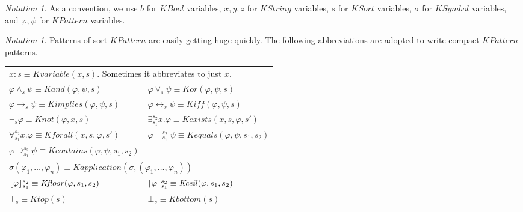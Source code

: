 \documentclass[UTF8]{article}
\newcounter{thmcounter}
\theoremstyle{plain}
\theoremstyle{definition}
\theoremstyle{remark}
\newtheorem{notation}[thmcounter]{Notation}
\newcommand{\cln}{{:}}
\DeclarePairedDelimiter{\ceil}{\lceil}{\rceil}
\DeclarePairedDelimiter{\floor}{\lfloor}{\rfloor}
\newcommand{\KBool}{\mathit{KBool}}
\newcommand{\KString}{\mathit{KString}}
\newcommand{\KSort}{\mathit{KSort}}
\newcommand{\KSymbol}{\mathit{KSymbol}}
\newcommand{\KPattern}{\mathit{KPattern}}
\newcommand{\Kvariable}{\mathit{Kvariable}}
\newcommand{\Kand}{\mathit{Kand}}
\newcommand{\Kor}{\mathit{Kor}}
\newcommand{\Kimplies}{\mathit{Kimplies}}
\newcommand{\Kiff}{\mathit{Kiff}}
\newcommand{\Knot}{\mathit{Knot}}
\newcommand{\Kapplication}{\mathit{Kapplication}}
\newcommand{\Kexists}{\mathit{Kexists}}
\newcommand{\Kforall}{\mathit{Kforall}}
\newcommand{\Kequals}{\mathit{Kequals}}
\newcommand{\Kcontains}{\mathit{Kcontains}}
\newcommand{\Ktop}{\mathit{Ktop}}
\newcommand{\Kbottom}{\mathit{Kbottom}}
\newcommand{\Kfloor}{\mathit{Kfloor}}
\newcommand{\Kceil}{\mathit{Kceil}}
\newcommand{\kand}{\wedge}
\newcommand{\kor}{\vee}
\newcommand{\kimplies}{\to}
\newcommand{\kiff}{\leftrightarrow}
\newcommand{\knot}{\neg}
\newcommand{\kexists}{\exists}
\newcommand{\kforall}{\forall}
\newcommand{\kequals}{=}
\newcommand{\kcontains}{\supseteq}
\newcommand{\kfloor}{\floor}
\newcommand{\kceil}{\ceil}
\newcommand{\ktop}{\top}
\newcommand{\kbottom}{\bot}
\begin{document}
\begin{notation}
	As a convention, we use $b$ for $\KBool$ variables, $x, y, z$ for 
	$\KString$ variables, $s$ for $\KSort$ variables, $\sigma$ for 
	$\KSymbol$ variables, and $\varphi, \psi$ for $\KPattern$ variables. 
\end{notation}

\begin{notation}
	Patterns of sort $\KPattern$ are easily getting huge quickly.
	The following abbreviations are adopted to write compact $\KPattern$ patterns.
	\begin{center}
	\begin{tabular}{ll}
    \multicolumn{2}{l}{$x \cln s \equiv \Kvariable(x, s)$. Sometimes it 
    abbreviates to just $x$.}
  \\
	$\varphi \kand_s \psi \equiv \Kand(\varphi, \psi, s)$
  & $\varphi \kor_s \psi \equiv \Kor(\varphi, \psi, s)$
  \\
    $\varphi \kimplies_s \psi \equiv \Kimplies(\varphi, \psi, s)$
  &	$\varphi \kiff_s \psi \equiv \Kiff(\varphi, \psi, s)$
  \\
    $\knot_s \varphi \equiv \Knot(\varphi, x, s)$
  & $\kexists_{s_1}^{s_2} x . \varphi \equiv \Kexists(x,s,\varphi,s')$
  \\
    $\kforall_{s_1}^{s_2} x . \varphi \equiv \Kforall(x,s,\varphi,s')$
  & $\varphi \kequals_{s_1}^{s_2} \psi \equiv \Kequals(\varphi, \psi, s_1, s_2)$
  \\
    $\varphi \kcontains_{s_1}^{s_2} \psi \equiv \Kcontains(\varphi, \psi, s_1, s_2)$
  \\
    \multicolumn{2}{l}{$\sigma(\varphi_1,\dots,\varphi_n) \equiv \Kapplication(\sigma, (\varphi_1,\dots,\varphi_n))$}
  \\
    $\kfloor{\varphi}_{s_1}^{s_2} \equiv \Kfloor(\varphi, s_1, s_2)$
  & $\kceil{\varphi}_{s_1}^{s_2} \equiv \Kceil(\varphi, s_1, s_2)$
  \\
    $\ktop_s \equiv \Ktop(s)$
  & $\kbottom_s \equiv \Kbottom(s)$
	\end{tabular}
    \end{center}
\end{notation}
\end{document}
